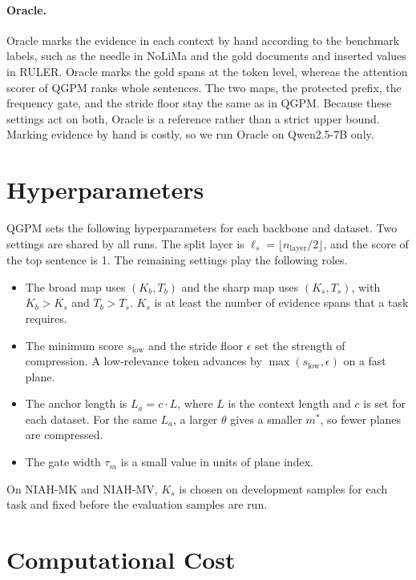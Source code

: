 \documentclass[11pt]{article}
\begin{document}
\paragraph{Oracle.}
Oracle marks the evidence in each context by hand according to the benchmark labels, such as the needle in NoLiMa and the gold documents and inserted values in RULER. Oracle marks the gold spans at the token level, whereas the attention scorer of QGPM ranks whole sentences. The two maps, the protected prefix, the frequency gate, and the stride floor stay the same as in QGPM. Because these settings act on both, Oracle is a reference rather than a strict upper bound. Marking evidence by hand is costly, so we run Oracle on Qwen2.5-7B only.

\section{Hyperparameters}
\label{app:hyperparams}

QGPM sets the following hyperparameters for each backbone and dataset. Two settings are shared by all runs. The split layer is $\ell_s = \lfloor n_{\mathrm{layer}}/2 \rfloor$, and the score of the top sentence is 1. The remaining settings play the following roles.
\begin{itemize}
    \setlength{\itemsep}{0pt}
    \setlength{\parskip}{0pt}
    \item The broad map uses $(K_b, T_b)$ and the sharp map uses $(K_s, T_s)$, with $K_b > K_s$ and $T_b > T_s$. $K_s$ is at least the number of evidence spans that a task requires.
    \item The minimum score $s_{\mathrm{low}}$ and the stride floor $\epsilon$ set the strength of compression. A low-relevance token advances by $\max(s_{\mathrm{low}}, \epsilon)$ on a fast plane.
    \item The anchor length is $L_a = c \cdot L$, where $L$ is the context length and $c$ is set for each dataset. For the same $L_a$, a larger $\theta$ gives a smaller $m^*$, so fewer planes are compressed.
    \item The gate width $\tau_m$ is a small value in units of plane index.
\end{itemize}
On NIAH-MK and NIAH-MV, $K_s$ is chosen on development samples for each task and fixed before the evaluation samples are run.

\section{Computational Cost}
\label{app:cost}
\end{document}
